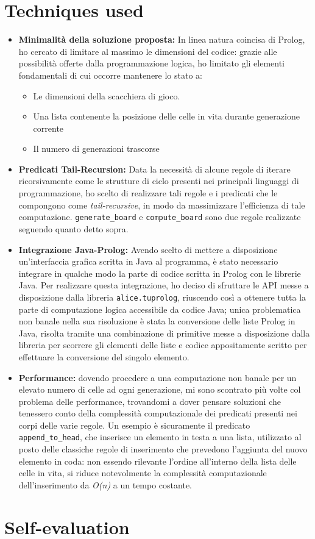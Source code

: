 \documentclass[10pt,italian]{article}
\begin{document}
\section{Techniques used}
\begin{itemize}
	\item \textbf{Minimalità della soluzione proposta:} In linea natura coincisa di Prolog, ho cercato di limitare al massimo le dimensioni del codice: grazie alle possibilità offerte dalla programmazione logica, ho limitato gli elementi fondamentali di cui occorre mantenere lo stato a:
	\begin{itemize}
		\item Le dimensioni della scacchiera di gioco.
		\item Una lista contenente la posizione delle celle in vita durante generazione corrente
		\item Il numero di generazioni trascorse
	\end{itemize}
	\item \textbf{Predicati Tail-Recursion:} Data la necessità di alcune regole di iterare ricorsivamente come le strutture di ciclo presenti nei principali linguaggi di programmazione, ho scelto di realizzare tali regole e i predicati che le compongono come \textit{tail-recursive}, in modo da massimizzare l'efficienza di tale computazione. \texttt{generate\_board} e \texttt{compute\_board} sono due regole realizzate seguendo quanto detto sopra.
	\item \textbf{Integrazione Java-Prolog:} Avendo scelto di mettere a disposizione un'interfaccia grafica scritta in Java al programma, è stato necessario integrare in qualche modo la parte di codice scritta in Prolog con le librerie Java. Per realizzare questa integrazione, ho deciso di sfruttare le API messe a disposizione dalla libreria \texttt{alice.tuprolog}, riuscendo così a ottenere tutta la parte di computazione logica accessibile da codice Java; unica problematica non banale nella sua risoluzione è stata la conversione delle liste Prolog in Java, risolta tramite una combinazione di primitive messe a disposizione dalla libreria per scorrere gli elementi delle liste e codice appositamente scritto per effettuare la conversione del singolo elemento.
	\item \textbf{Performance:} dovendo procedere a una computazione non banale per un elevato numero di celle ad ogni generazione, mi sono scontrato più volte col problema delle performance, trovandomi a dover pensare soluzioni che tenessero conto della complessità computazionale dei predicati presenti nei corpi delle varie regole. Un esempio è sicuramente il predicato \texttt{append\_to\_head}, che inserisce un elemento in testa a una lista, utilizzato al posto delle classiche regole di inserimento che prevedono l'aggiunta del nuovo elemento in coda: non essendo rilevante l'ordine all'interno della lista delle celle in vita, si riduce notevolmente la complessità computazionale dell'inserimento da \textit{O(n)} a un tempo costante.\\
\end{itemize}

\section{Self-evaluation}

 
\end{document}
